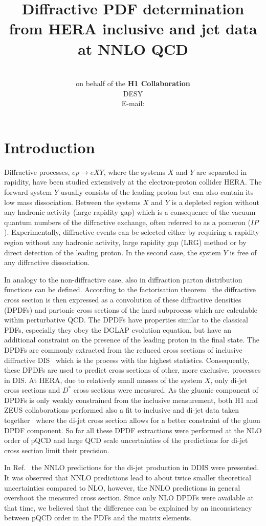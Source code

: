 \documentclass{PoS}
\title{Diffractive PDF determination from HERA inclusive and jet data at NNLO QCD}
\author{\speaker{Radek \v{Z}leb\v{c}\'{i}k}\\ on behalf of the \textup{\textbf{H1 Collaboration}} \\
        DESY\\
        E-mail: \email{radek.zlebcik@desy.de}}
\newcommand{\IP}{I\!\!P}
\begin{document}
\section{Introduction}

Diffractive processes, $ep \to  eXY$, where the systems $X$ and $Y$ are separated in rapidity, have been studied extensively at the electron-proton collider HERA.
The forward system $Y$ usually consists of the leading proton but can also contain its low mass dissociation.
Between the systems $X$ and $Y$ is a depleted region without any hadronic activity (large rapidity gap) which is a consequence of the vacuum quantum numbers of the diffractive exchange, often referred to as a pomeron ($\IP$).
Experimentally, diffractive events can be selected either by requiring a rapidity region without any hadronic activity, large rapidity gap (LRG) method or by direct detection of the leading proton.
In the second case, the system $Y$ is free of any diffractive dissociation.

In analogy to the non-diffractive case, also in diffraction parton distribution functions can be defined.
According to the factorisation theorem~\cite{Collins:1997sr} the diffractive cross section is then expressed as a convolution of these diffractive densities (DPDFs) and partonic cross sections of the hard subprocess which are calculable within perturbative QCD.
The DPDFs have properties similar to the classical PDFs, especially they obey the DGLAP evolution equation, but have an additional constraint on the presence of the leading proton in the final state.
The DPDFs are commonly extracted from the reduced cross sections of inclusive diffractive DIS~\cite{Aktas:2006hy} which is the process with the highest statistics.
Consequently, these DPDFs are used to predict cross sections of other, more exclusive, processes in DIS.
At HERA, due to relatively small masses of the system $X$, only di-jet cross sections and $D^{*}$ cross sections were measured.
As the gluonic component of DPDFs is only weakly constrained from the inclusive measurement, both H1 and ZEUS collaborations performed also a fit to inclusive and di-jet data taken together~\cite{Aktas:2007bv,Chekanov:2009aa} where the di-jet cross section allows for a better constraint of the gluon DPDF component.
So far all these DPDF extractions were performed at the NLO order of pQCD and large QCD scale uncertainties of the predictions for di-jet cross section limit their precision.

In Ref.~\cite{Britzger:2018zvv} the NNLO predictions for the di-jet production in DDIS were presented.
It was observed that NNLO predictions lead to about twice smaller theoretical uncertainties compared to NLO, however, the NNLO predictions in general overshoot the measured cross section.
Since only NLO DPDFs were available at that time, we believed that the difference can be explained by an inconsistency between pQCD order in the PDFs and the matrix elements.
\end{document}
